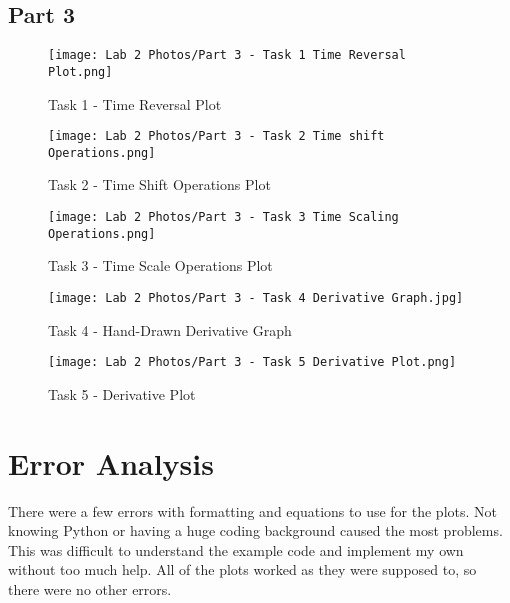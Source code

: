 \documentclass[12pt]{report}
\begin{document}
\newpage
\subsection{Part 3}  %
\begin{figure}[ht]
\begin{center}
\texttt{[image: Lab 2 Photos/Part 3 - Task 1 Time Reversal Plot.png]}
\caption{Task 1 - Time Reversal Plot}
\end{center}
\end{figure}

\begin{figure}[ht]
\begin{center}
\texttt{[image: Lab 2 Photos/Part 3 - Task 2 Time shift Operations.png]}
\caption{Task 2 - Time Shift Operations Plot}
\end{center}
\end{figure}
\clearpage

\newpage
\begin{figure}[ht]
\begin{center}
\texttt{[image: Lab 2 Photos/Part 3 - Task 3 Time Scaling Operations.png]}
\caption{Task 3 - Time Scale Operations Plot}
\end{center}
\end{figure}

\newpage
\begin{figure}[ht]
\begin{center}
\texttt{[image: Lab 2 Photos/Part 3 - Task 4 Derivative Graph.jpg]}
\caption{Task 4 - Hand-Drawn Derivative Graph}
\end{center}
\end{figure}

\begin{figure}[ht]
\begin{center}
\texttt{[image: Lab 2 Photos/Part 3 - Task 5 Derivative Plot.png]}
\caption{Task 5 - Derivative Plot}
\end{center}
\end{figure}
\clearpage

\newpage
\section{Error Analysis}
 There were a few errors with formatting and equations to use for the plots. Not knowing Python or having a huge coding background caused the most problems. This was difficult to understand the example code and implement my own without too much help. All of the plots worked as they were supposed to, so there were no other errors. 
\end{document}

